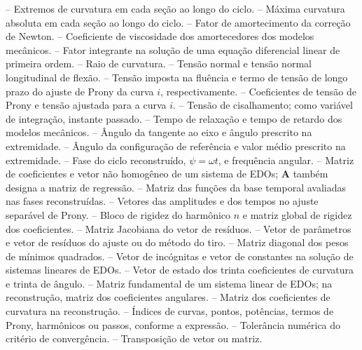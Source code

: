 \documentclass[arial,centeredequations,english,brazilian,oneside,section=TITLE]{ifes8}
\begin{document}
\begin{simbolos}
  \simb{$\kappa_{\max},\ \kappa_{\min}$} -- Extremos de curvatura em cada seção ao longo do ciclo.
   -- Máxima curvatura absoluta em cada seção ao longo do ciclo.
  \simb{$\lambda$} -- Fator de amortecimento da correção de Newton.
  \simb{$\mu$} -- Coeficiente de viscosidade dos amortecedores dos modelos mecânicos.
   -- Fator integrante na solução de uma equação diferencial linear de primeira ordem.
  \simb{$\rho$} -- Raio de curvatura.
   -- Tensão normal e tensão normal longitudinal de flexão.
   -- Tensão imposta na fluência e termo de tensão de longo prazo do ajuste de Prony da curva $i$, respectivamente.
   -- Coeficientes de tensão de Prony e tensão ajustada para a curva $i$.
  \simb{$\tau$} -- Tensão de cisalhamento; como variável de integração, instante passado.
   -- Tempo de relaxação e tempo de retardo dos modelos mecânicos.
   -- Ângulo da tangente ao eixo e ângulo prescrito na extremidade.
   -- Ângulo da configuração de referência e valor médio prescrito na extremidade.
  \simb{$\psi,\ \omega$} -- Fase do ciclo reconstruído, $\psi=\omega t$, e frequência angular.
   -- Matriz de coeficientes e vetor não homogêneo de um sistema de EDOs; $\mathbf A$ também designa a matriz de regressão.
   -- Matriz das funções da base temporal avaliadas nas fases reconstruídas.
   -- Vetores das amplitudes e dos tempos no ajuste separável de Prony.
   -- Bloco de rigidez do harmônico $n$ e matriz global de rigidez dos coeficientes.
   -- Matriz Jacobiana do vetor de resíduos.
   -- Vetor de parâmetros e vetor de resíduos do ajuste ou do método do tiro.
   -- Matriz diagonal dos pesos de mínimos quadrados.
   -- Vetor de incógnitas e vetor de constantes na solução de sistemas lineares de EDOs.
   -- Vetor de estado dos trinta coeficientes de curvatura e trinta de ângulo.
  \simb{$\boldsymbol\Phi$} -- Matriz fundamental de um sistema linear de EDOs; na reconstrução, matriz dos coeficientes angulares.
   -- Matriz dos coeficientes de curvatura na reconstrução.
   -- Índices de curvas, pontos, potências, termos de Prony, harmônicos ou passos, conforme a expressão.
   -- Tolerância numérica do critério de convergência.
   -- Transposição de vetor ou matriz.
\end{simbolos}
\cleardoublepage
\end{document}

